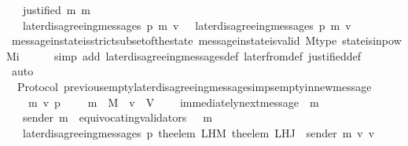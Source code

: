 \begin{isabellebody}
\ \ {\isasymlongrightarrow}\ justified\ m{}\ m{}\isanewline
\ \ {\isasymlongrightarrow}\ later{\isacharunderscore}disagreeing{\isacharunderscore}messages\ {\isacharparenleft}p{\isacharcomma}\ m{}{\isacharcomma}\ v{\isacharcomma}\ {\isasymsigma}{\isacharparenright}\ {\isasymsubseteq}\ later{\isacharunderscore}disagreeing{\isacharunderscore}messages\ {\isacharparenleft}p{\isacharcomma}\ m{}{\isacharcomma}\ v{\isacharcomma}\ {\isasymsigma}{\isacharparenright}{\isachardoublequoteclose}\isanewline
%
\isadelimproof
\ \ %
\endisadelimproof
%
\isatagproof
{}\isamarkupfalse%
\ message{\isacharunderscore}in{\isacharunderscore}state{\isacharunderscore}is{\isacharunderscore}strict{\isacharunderscore}subset{\isacharunderscore}of{\isacharunderscore}the{\isacharunderscore}state\ message{\isacharunderscore}in{\isacharunderscore}state{\isacharunderscore}is{\isacharunderscore}valid\ M{\isacharunderscore}type\ state{\isacharunderscore}is{\isacharunderscore}in{\isacharunderscore}pow{\isacharunderscore}Mi\ \ \isanewline
\ \ \isamarkupfalse%
\ {\isacharparenleft}simp\ add{\isacharcolon}\ later{\isacharunderscore}disagreeing{\isacharunderscore}messages{\isacharunderscore}def\ later{\isacharunderscore}from{\isacharunderscore}def\ justified{\isacharunderscore}def{\isacharparenright}\isanewline
\ \ \isamarkupfalse%
\ auto%
\endisatagproof
{\isafoldproof}%
%
\isadelimproof
\isanewline
%
\endisadelimproof
\isanewline
\isanewline
{}\isamarkupfalse%
\ {\isacharparenleft}\ Protocol{\isacharparenright}\ previous{\isacharunderscore}empty{\isacharunderscore}later{\isacharunderscore}disagreeing{\isacharunderscore}messages{\isacharunderscore}imps{\isacharunderscore}empty{\isacharunderscore}in{\isacharunderscore}new{\isacharunderscore}message\ {\isacharcolon}\isanewline
\ \ {\isachardoublequoteopen}{\isasymforall}\ {\isasymsigma}\ m\ v\ p{\isachardot}\ {\isasymsigma}\ {\isasymin}\ {\isasymSigma}\ {\isasymand}\ m\ {\isasymin}\ M\ {\isasymand}\ v\ {\isasymin}\ V\ \isanewline
\ \ {\isasymlongrightarrow}\ immediately{\isacharunderscore}next{\isacharunderscore}message\ {\isacharparenleft}{\isasymsigma}{\isacharcomma}\ m{\isacharparenright}\isanewline
\ \ {\isasymlongrightarrow}\ sender\ m\ {\isasymnotin}\ equivocating{\isacharunderscore}validators\ {\isacharparenleft}{\isasymsigma}\ {\isasymunion}\ {\isacharbraceleft}m{\isacharbraceright}{\isacharparenright}\isanewline
\ \ {\isasymlongrightarrow}\ later{\isacharunderscore}disagreeing{\isacharunderscore}messages\ {\isacharparenleft}p{\isacharcomma}\ {\isacharparenleft}the{\isacharunderscore}elem\ {\isacharparenleft}L{\isacharunderscore}H{\isacharunderscore}M\ {\isacharparenleft}the{\isacharunderscore}elem\ {\isacharparenleft}L{\isacharunderscore}H{\isacharunderscore}J\ {\isasymsigma}\ {\isacharparenleft}sender\ m{\isacharparenright}{\isacharparenright}{\isacharparenright}\ v{\isacharparenright}{\isacharparenright}{\isacharcomma}\ v{\isacharcomma}\ {\isasymsigma}{\isacharparenright}\ {\isacharequal}\ {\isasymemptyset}\isanewline

\end{isabellebody}
